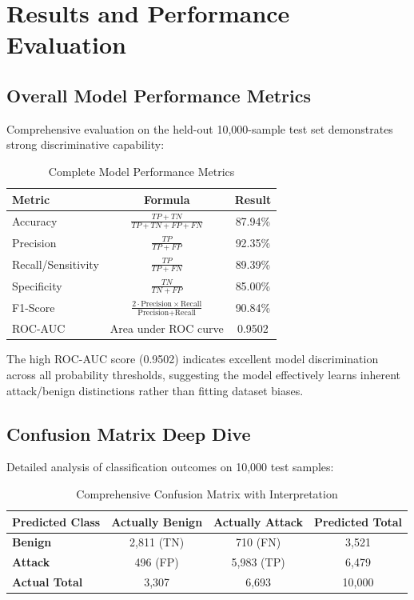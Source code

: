 \documentclass[conference]{IEEEtran}
\begin{document}
\section{Results and Performance Evaluation}

\subsection{Overall Model Performance Metrics}

Comprehensive evaluation on the held-out 10,000-sample test set demonstrates strong discriminative capability:

\begin{table}[H]
\centering
\caption{Complete Model Performance Metrics}
\begin{tabular}{|l|c|c|}
\hline
\textbf{Metric} & \textbf{Formula} & \textbf{Result} \\
\hline
Accuracy & $\frac{TP+TN}{TP+TN+FP+FN}$ & 87.94\% \\
\hline
Precision & $\frac{TP}{TP+FP}$ & 92.35\% \\
\hline
Recall/Sensitivity & $\frac{TP}{TP+FN}$ & 89.39\% \\
\hline
Specificity & $\frac{TN}{TN+FP}$ & 85.00\% \\
\hline
F1-Score & $\frac{2 \cdot \text{Precision} \times \text{Recall}}{\text{Precision}+\text{Recall}}$ & 90.84\% \\
\hline
ROC-AUC & Area under ROC curve & 0.9502 \\
\hline
\end{tabular}
\end{table}

The high ROC-AUC score (0.9502) indicates excellent model discrimination across all probability thresholds, suggesting the model effectively learns inherent attack/benign distinctions rather than fitting dataset biases.

\subsection{Confusion Matrix Deep Dive}

Detailed analysis of classification outcomes on 10,000 test samples:

\begin{table}[H]
\centering
\caption{Comprehensive Confusion Matrix with Interpretation}
\begin{tabular}{|l|c|c|c|}
\hline
\textbf{Predicted Class} & \textbf{Actually Benign} & \textbf{Actually Attack} & \textbf{Predicted Total} \\
\hline
\textbf{Benign} & 2,811 (TN) & 710 (FN) & 3,521 \\
\hline
\textbf{Attack} & 496 (FP) & 5,983 (TP) & 6,479 \\
\hline
\textbf{Actual Total} & 3,307 & 6,693 & 10,000 \\
\hline
\end{tabular}
\end{table}
\end{document}
